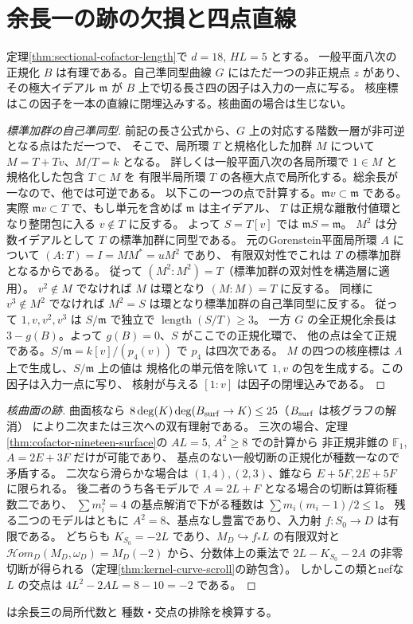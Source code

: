 \section{余長一の跡の欠損と四点直線}
\label{sec:sectional-trace-defect-one}
\begin{theorem}\label{thm:sectional-trace-defect-one}
定理\ref{thm:sectional-cofactor-length}で $d=18$, $HL=5$ とする。
一般平面八次の正規化 $B$ は有理である。自己準同型曲線 $G$ にはただ一つの非正規点 $z$ があり、
その極大イデアル $\mathfrak m$ が $B$ 上で切る長さ四の因子は入力の一点に写る。
核座標はこの因子を一本の直線に閉埋込みする。核曲面の場合は生じない。
\end{theorem}
\begin{proof}[標準加群の自己準同型]
前記の長さ公式から、$G$ 上の対応する階数一層が非可逆となる点はただ一つで、
そこで、局所環 $T$ と規格化した加群 $M$ について $M=T+Tv$、$M/T=k$ となる。
詳しくは一般平面八次の各局所環で $1\in M$ と規格化した包含 $T\subset M$ を
有限半局所環 $T$ の各極大点で局所化する。総余長が一なので、他では可逆である。
以下この一つの点で計算する。$\mathfrak m v\subset\mathfrak m$ である。
実際 $\mathfrak m v\subset T$ で、もし単元を含めば $\mathfrak m$ は主イデアル、
$T$ は正規な離散付値環となり整閉包に入る $v\notin T$ に反する。
よって $S=T[v]$ では $\mathfrak mS=\mathfrak m$。
$M^2$ は分数イデアルとして $T$ の標準加群に同型である。
元のGorenstein平面局所環 $A$ について $(A:T)=I=M M^*=uM^2$ であり、
有限双対性でこれは $T$ の標準加群となるからである。
従って $(M^2:M^2)=T$（標準加群の双対性を構造層に適用）。
$v^2\notin M$ でなければ $M$ は環となり $(M:M)=T$ に反する。
同様に $v^3\notin M^2$ でなければ $M^2=S$ は環となり標準加群の自己準同型に反する。
従って $1,v,v^2,v^3$ は $S/\mathfrak m$ で独立で $\operatorname{length}(S/T)\ge3$。
一方 $G$ の全正規化余長は $3-g(B)$。よって $g(B)=0$、$S$ がここでの正規化環で、
他の点は全て正規である。$S/\mathfrak m=k[v]/(p_4(v))$ で $p_4$ は四次である。
$M$ の四つの核座標は $A$ 上で生成し、$S/\mathfrak m$ 上の値は
規格化の単元倍を除いて $1,v$ の包を生成する。この因子は入力一点に写り、
核射が与える $[1:v]$ は因子の閉埋込みである。

\end{proof}
\begin{proof}[核曲面の跡]
曲面核なら $8\deg(K)\deg(B_{\rm surf}\to K)\le25$（$B_{\rm surf}$ は核グラフの解消）
により二次または三次への双有理射である。
三次の場合、定理\ref{thm:cofactor-nineteen-surface}の $AL=5$, $A^2\ge8$ での計算から
非正規非錐の $\mathbb F_1$, $A=2E+3F$ だけが可能であり、
基点のない一般切断の正規化が種数一なので矛盾する。
二次なら滑らかな場合は $(1,4),(2,3)$、錐なら $E+5F,2E+5F$ に限られる。
後二者のうち各モデルで $A=2L+F$ となる場合の切断は算術種数二であり、
$\sum m_i^2=4$ の基点解消で下がる種数は $\sum m_i(m_i-1)/2\le1$。
残る二つのモデルはともに $A^2=8$、基点なし豊富であり、入力射 $f:S_0\to D$ は有限である。
どちらも $K_{S_0}=-2L$ であり、$M_D\hookrightarrow f_*L$ の有限双対と
$\mathcal Hom_D(M_D,\omega_D)=M_D(-2)$ から、分数体上の乗法で
$2L-K_{S_0}-2A$ の非零切断が得られる（定理\ref{thm:kernel-curve-scroll}の跡包含）。
しかしこの類とnefな $L$ の交点は $4L^2-2AL=8-10=-2$ である。
\end{proof}
 は余長三の局所代数と
種数・交点の排除を検算する。
